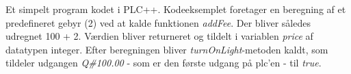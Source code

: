 Et simpelt program kodet i PLC++. Kodeeksemplet foretager en beregning af et predefineret gebyr (2) ved at kalde funktionen \textit{addFee}. Der bliver således udregnet 100 + 2. Værdien bliver returneret og tildelt i variablen \textit{price} af datatypen integer. Efter beregningen bliver \textit{turnOnLight}-metoden kaldt, som tildeler udgangen \textit{Q\#100.00} - som er den første udgang på \gls{plc}'en - til \textit{true}.
